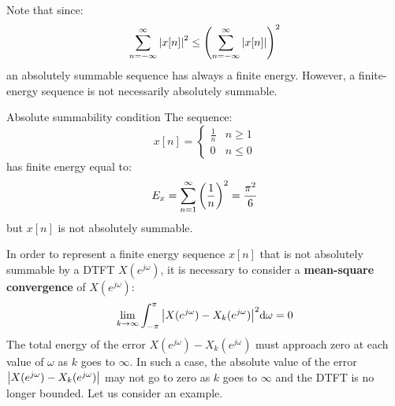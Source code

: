 \documentclass[../../main/main.tex]{subfiles}
\begin{document}
Note that since:
\begin{equation}
    \sum_{n=-\infty}^{\infty} \abs{x[n]}^2
    \le
    \qty(\sum_{n=-\infty}^{\infty} \abs{x[n]})^2
    \label{eq:L08_S33_2}
\end{equation}
an absolutely summable sequence has always a finite energy. However, a finite-energy sequence is not necessarily absolutely summable.

\begin{example}{Absolute summability condition}{}
    The sequence:
    \begin{equation}
        x[n]
        =
        \begin{cases}
            \frac{1}{n} &   n \ge 1 \\
            0   &   n \le 0
        \end{cases}
        \label{eq:L08_S35_1}
    \end{equation}
    has finite energy equal to:
    \begin{equation}
        E_{x}
        =
        \sum_{n=1}^{\infty} \qty(\frac{1}{n})^2
        =
        \frac{\pi^2}{6}
        \label{eq:L08_S35_2}
    \end{equation}
    but \( x[n] \) is not absolutely summable.
\end{example}


\medskip
{}
In order to represent a finite energy sequence \( x[n] \) that is not absolutely summable by a DTFT \( X(e^{j\omega}) \), it is necessary to consider a \textbf{mean-square convergence} of \( X(e^{j\omega}) \):
\begin{equation}
    \lim_{k \to \infty}
    \int_{-\pi}^{\pi} \abs{X(e^{j\omega}) - X_{k}(e^{j\omega})}^{2} \mathrm{d}{\omega}
    =
    0
    \label{eq:L08_S36_1}
\end{equation}
The total energy of the error \( X(e^{j\omega}) - X_{k}(e^{j\omega}) \) must approach zero at each value of \( \omega \) as \( k \) goes to \( \infty \). In such a case, the absolute value of the error \( \abs{X(e^{j\omega}) - X_{k}(e^{j\omega})} \) may not go to zero as \( k \) goes to \( \infty \) and the DTFT is no longer bounded. Let us consider an example.
\end{document}
